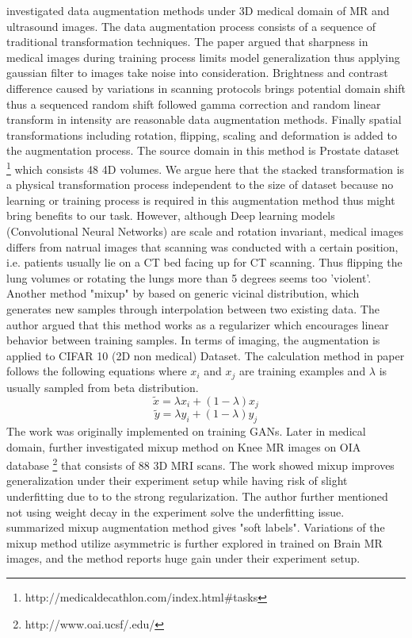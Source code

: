 \cite{zhang_when_2019} investigated data augmentation methods under 3D medical domain of MR and ultrasound images. 
The data augmentation process consists of a sequence of traditional transformation techniques. The paper argued that sharpness in medical images during training process limits model generalization thus applying gaussian filter to images take noise into consideration. Brightness and contrast difference caused by variations in scanning protocols brings potential domain shift thus a sequenced random shift followed gamma correction and random linear transform in intensity are reasonable data augmentation methods. Finally spatial transformations including rotation, flipping, scaling and deformation is added to the augmentation process.
The source domain in this method is Prostate dataset \footnote{http://medicaldecathlon.com/index.html\#tasks} which consists 48 4D volumes.
We argue here that the stacked transformation is a physical transformation process independent to the size of dataset because no learning or training process is required in this augmentation method thus might bring benefits to our task. However, although Deep learning models (Convolutional Neural Networks) are scale and rotation invariant, medical images differs from natrual images that scanning was conducted with a certain position, i.e. patients usually lie on a CT bed facing up for CT scanning. Thus flipping the lung volumes or rotating the lungs more than 5 degrees seems too 'violent'.\\


Another method "mixup" by \cite{zhang_mixup_2018} based on generic vicinal distribution, which generates new samples through interpolation between two existing data. The author argued that this method works as a regularizer which encourages linear behavior between training samples. In terms of imaging, the augmentation is applied to CIFAR 10 (2D non medical) Dataset. The calculation method in paper follows the following equations where $x_{i}$ and $x_{j}$ are training examples and $\lambda$ is usually sampled from beta distribution.
$$\tilde{x}=\lambda x_{i}+(1-\lambda) x_{j}$$
$$\tilde{y}=\lambda y_{i}+(1-\lambda) y_{j}$$
The work was originally implemented on training GANs. Later in medical domain, \cite{panfilov_improving_2019} further investigated mixup method on Knee MR images on OIA database \footnote{http://www.oai.ucsf/.edu/} that consists of 88 3D MRI scans. The work showed mixup improves generalization under their experiment setup while having risk of slight underfitting due to to the strong regularization. The author further mentioned not using weight decay in the experiment solve the underfitting issue.
\cite{tajbakhsh_embracing_2020} summarized mixup augmentation method gives "soft labels". Variations of the mixup method utilize asymmetric is further explored in \cite{li_overfitting_2019} trained on Brain MR images, and the method reports huge gain under their experiment setup.

